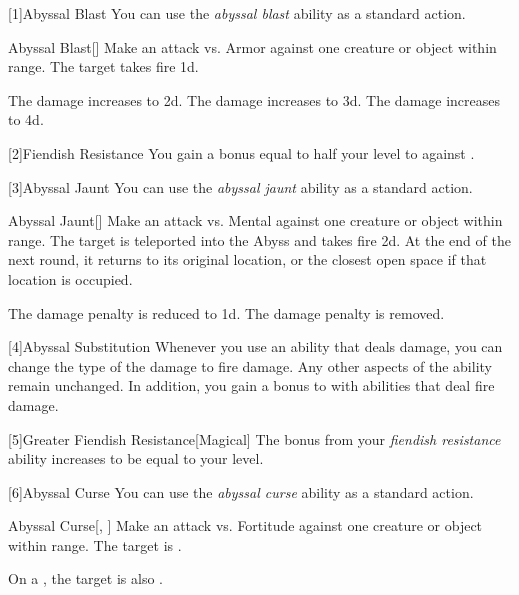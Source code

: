         [1]{Abyssal Blast} You can use the \textit{abyssal blast} ability as a standard action.
        \begin{freeability}{Abyssal Blast}[]
            Make an attack vs. Armor against one creature or object within \rngclose range.
            \hit The target takes fire  \plus1d.

            \rankline
             The damage increases to  \plus2d.
             The damage increases to  \plus3d.
             The damage increases to  \plus4d.
        \end{freeability}

        [2]{Fiendish Resistance} You gain a bonus equal to half your level to  against .

        [3]{Abyssal Jaunt} You can use the \textit{abyssal jaunt} ability as a standard action.
        \begin{freeability}{Abyssal Jaunt}[]
            Make an attack vs. Mental against one creature or object within \rngclose range.
            \hit The target is teleported into the Abyss and takes fire  \minus2d.
            At the end of the next round, it returns to its original location, or the closest open space if that location is occupied.

            \rankline
             The damage penalty is reduced to \minus1d.
             The damage penalty is removed.
        \end{freeability}

        [4]{Abyssal Substitution} Whenever you use an ability that deals damage, you can change the type of the damage to fire damage.
        Any other aspects of the ability remain unchanged.
        In addition, you gain a  bonus to  with abilities that deal fire damage.

        [5]{Greater Fiendish Resistance}[Magical] The bonus from your \textit{fiendish resistance} ability increases to be equal to your level.

        [6]{Abyssal Curse} You can use the \textit{abyssal curse} ability as a standard action.
        \begin{freeability}{Abyssal Curse}[, ]
            Make an attack vs. Fortitude against one creature or object within \rngclose range.
            \hit The target is .

            \rankline
             On a , the target is also .
        \end{freeability}

